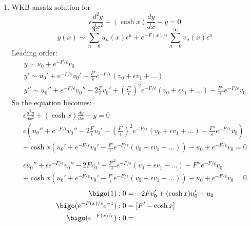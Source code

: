 \documentclass{/home/janmebows/Documents/LatexTemplates/myassignment}
\begin{document}
\begin{enumerate}
\begin{enumerate}
		\item WKB ansatz solution for
		\[\epsilon \frac{d^2y}{dx^2} + (\cosh x) \frac{dy}{dx} - y= 0\]
		\[y(x) \sim \sum_{n=0}^\infty u_n(x) \epsilon^n + e^{-F(x)/\epsilon} \sum_{n=0}^\infty v_n(x) \epsilon^{n}\] 
		Leading order:
		\begin{align*}
			y \sim u_0 + e^{-F/\epsilon} v_0\\
			y' \sim u_0' + e^{-F/\epsilon} v_0' - \frac{F'}{\epsilon} e^{-F/\epsilon}(v_0 + \epsilon v_1 + \hdots)\\
			y'' \sim u_0'' + e^{-F/\epsilon} v_0'' - 2\frac{F}{\epsilon} v_0' + \left(\frac{F'}{\epsilon}\right)^2 e^{-F/\epsilon} \left(v_0 + \epsilon v_1 + \ldots\right) - \frac{F''}{\epsilon} e^{-F/\epsilon} v_0
		\end{align*}
		So the equation becomes:
		\begin{align*}
			\epsilon \frac{d^2y}{dx^2} + (\cosh x) \frac{dy}{dx} - y= 0\\
			\epsilon\left(u_0'' + e^{-F/\epsilon} v_0'' - 2\frac{F}{\epsilon} v_0' + \left(\frac{F'}{\epsilon}\right)^2 e^{-F/\epsilon} \left(v_0 + \epsilon v_1 + \ldots\right) - \frac{F''}{\epsilon} e^{-F/\epsilon} v_0\right)\\
			+ \cosh x\left(u_0' + e^{-F/\epsilon} v_0' - \frac{F'}{\epsilon} e^{-F/\epsilon}(v_0 + \epsilon v_1 + \hdots)\right) - u_0 + e^{-F/\epsilon} v_0 =0\\\\
			\epsilon u_0'' + \epsilon e^{-F/\epsilon} v_0'' - 2F v_0' + \frac{F'^2}{\epsilon} e^{-F/\epsilon} \left(v_0 + \epsilon v_1 + \ldots\right) - F'' e^{-F/\epsilon} v_0\\
			+ \cosh x\left(u_0' + e^{-F/\epsilon} v_0' - \frac{F'}{\epsilon} e^{-F/\epsilon}(v_0 + \epsilon v_1 + \hdots)\right) - u_0 + e^{-F/\epsilon} v_0 =0
		\end{align*}
		\begin{align*}
			\bigo(1): 0 &= -2F v_0' +(\cosh x)u_0' - u_0\\
			\bigo(e^{-F(x)/\epsilon} \epsilon^{-1}) : 0&=\left[F'- \cosh x\right]\\
			\bigo(e^{-F(x)/\epsilon}) : 0&=
		\end{align*}



\end{enumerate}
\end{enumerate}
\end{document}
